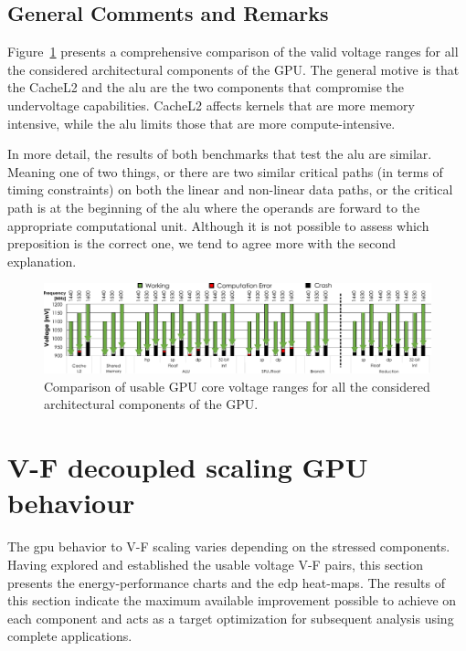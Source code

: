 \subsection{General Comments and Remarks}


Figure~\ref{fig:Guardband_comparison} presents a comprehensive comparison of the valid voltage ranges for all the considered architectural components of the GPU. The general motive is that the CacheL2 and the \acrshort{alu} are the two components that compromise the undervoltage capabilities. CacheL2 affects kernels that are more memory intensive, while the \acrshort{alu} limits those that are more compute-intensive. 

In more detail, the results of both benchmarks that test the \acrshort{alu} are similar. Meaning one of two things, or there are two similar critical paths (in terms of timing constraints) on both the linear and non-linear data paths, or the critical path is at the beginning of the  \acrshort{alu} where the operands are forward to the appropriate computational unit. Although it is not possible to assess which preposition is the correct one, we tend to agree more with the second explanation.


\begin{figure}[h]
    \centering
        \includegraphics[width=1\textwidth]{Figures/GPU_characterization/Comparison_Guardband.pdf}
        \caption{Comparison of usable GPU core voltage ranges for all the considered architectural components of the GPU.}
    \label{fig:Guardband_comparison}
\end{figure}

\section{V-F decoupled scaling GPU behaviour}
\label{sec:gpu_behaviour}

The \acrshort{gpu} behavior to V-F scaling varies depending on the stressed components. Having explored and established the usable voltage V-F  pairs, this section presents the energy-performance charts and the \acrshort{edp} heat-maps. The results of this section indicate the maximum available improvement possible to achieve on each component and acts as a target optimization for subsequent analysis using complete applications.

